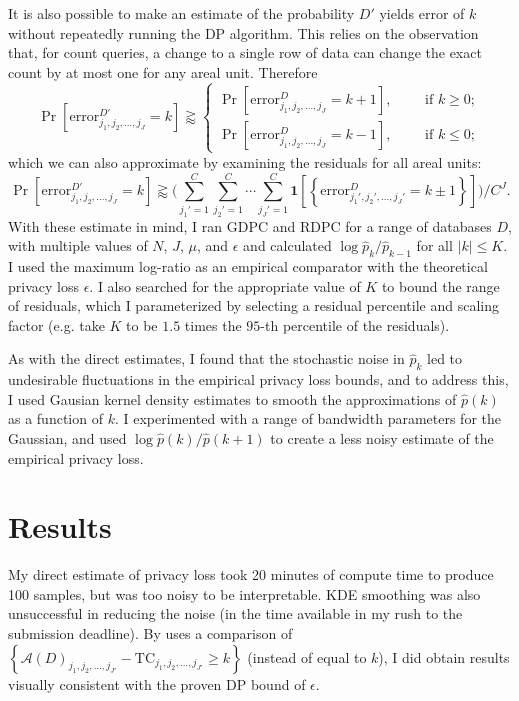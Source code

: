 \documentclass{article}
\begin{document}
It is also possible to make an estimate of the probability $D'$ yields error of $k$ without repeatedly running the DP algorithm.  This relies on the observation that, for count queries, a change to a single row of data can change the exact count by at most one for any areal unit.  Therefore
$$
\Pr\left[\mathrm{error}_{j_1, j_2, \ldots, j_{J}}^{D'}
= k\right]
\gtrapprox
\begin{cases}
\Pr\left[\mathrm{error}_{j_1, j_2, \ldots, j_{J}}^{D}
= k+1\right], \qquad \text{ if } k \geq 0;\\[.1in]
\Pr\left[\mathrm{error}_{j_1, j_2, \ldots, j_{J}}^{D}
= k-1\right], \qquad \text{ if } k \leq 0;
\end{cases}
$$
which we can also approximate by examining the residuals for all areal units:
$$\Pr\left[\mathrm{error}_{j_1, j_2, \ldots, j_{J}}^{D'}
= k\right]
\gtrapprox 
\bigg(\sum_{j_1'=1}^C\sum_{j_2'=1}^C\cdots\sum_{j_J' = 1}^C \mathbf{1}\left[\left\{\mathrm{error}_{j_1', j_2', \ldots, j_{J}'}^D
= k\pm 1\right\}\right]\bigg)\bigg/C^J.
$$
With these estimate in mind, I ran GDPC and RDPC for a range of databases $D$, with multiple values of $N$, $J$, $\mu$, and $\epsilon$ and calculated $\log \hat{p}_k / \hat{p}_{k-1}$ for all $|k| \leq K$. I used the maximum log-ratio as an empirical comparator with the theoretical privacy loss $\epsilon$.  I also searched for the appropriate value of $K$ to bound the range of residuals, which I parameterized by selecting a residual percentile and scaling factor (e.g. take $K$ to be $1.5$ times the $95$-th percentile of the residuals).

As with the direct estimates, I found that the stochastic noise in $\hat{p}_k$ led to undesirable fluctuations in the empirical privacy loss bounds, and to address this, I used Gausian kernel density estimates to smooth the approximations of $\hat{p}(k)$ as a function of $k$.  I experimented with a range of bandwidth parameters for the Gaussian, and used $\log \hat{p}(k) / \hat{p}(k+1)$ to create a less noisy estimate of the empirical privacy loss.

\section{Results}
\label{results}

My direct estimate of privacy loss took 20 minutes of compute time to produce 100 samples, but was too noisy to be interpretable. KDE smoothing was also unsuccessful in reducing the noise (in the time available in my rush to the submission deadline).  By uses a comparison of $\left\{\mathcal{A}(D)_{j_1, j_2, \ldots, j_{J'}}
- \mathrm{TC}_{j_1, j_2, \ldots, j_{J'}}
\geq k\right\}$ (instead of equal to $k$), I did obtain results visually consistent with the proven DP bound of $\epsilon$.
\end{document}
